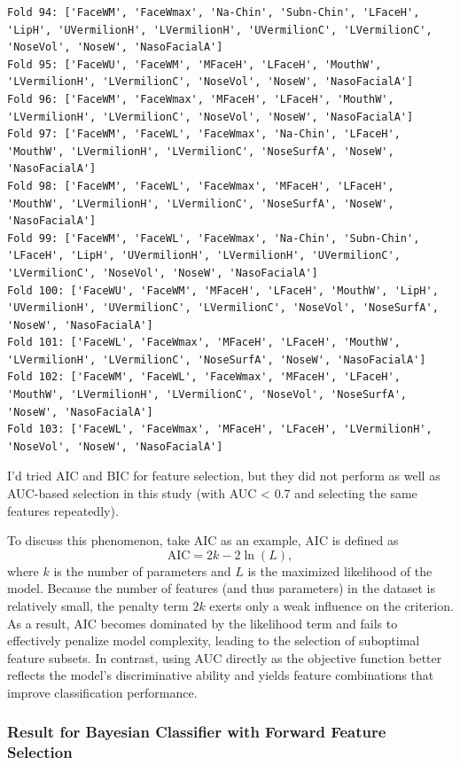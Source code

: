 \documentclass[12pt,a4paper]{article}
\begin{document}
\begin{verbatim}
Fold 94: ['FaceWM', 'FaceWmax', 'Na-Chin', 'Subn-Chin', 'LFaceH', 'LipH', 'UVermilionH', 'LVermilionH', 'UVermilionC', 'LVermilionC', 'NoseVol', 'NoseW', 'NasoFacialA']
Fold 95: ['FaceWU', 'FaceWM', 'MFaceH', 'LFaceH', 'MouthW', 'LVermilionH', 'LVermilionC', 'NoseVol', 'NoseW', 'NasoFacialA']
Fold 96: ['FaceWM', 'FaceWmax', 'MFaceH', 'LFaceH', 'MouthW', 'LVermilionH', 'LVermilionC', 'NoseVol', 'NoseW', 'NasoFacialA']
Fold 97: ['FaceWM', 'FaceWL', 'FaceWmax', 'Na-Chin', 'LFaceH', 'MouthW', 'LVermilionH', 'LVermilionC', 'NoseSurfA', 'NoseW', 'NasoFacialA']
Fold 98: ['FaceWM', 'FaceWL', 'FaceWmax', 'MFaceH', 'LFaceH', 'MouthW', 'LVermilionH', 'LVermilionC', 'NoseSurfA', 'NoseW', 'NasoFacialA']
Fold 99: ['FaceWM', 'FaceWL', 'FaceWmax', 'Na-Chin', 'Subn-Chin', 'LFaceH', 'LipH', 'UVermilionH', 'LVermilionH', 'UVermilionC', 'LVermilionC', 'NoseVol', 'NoseW', 'NasoFacialA']
Fold 100: ['FaceWU', 'FaceWM', 'MFaceH', 'LFaceH', 'MouthW', 'LipH', 'UVermilionH', 'UVermilionC', 'LVermilionC', 'NoseVol', 'NoseSurfA', 'NoseW', 'NasoFacialA']
Fold 101: ['FaceWL', 'FaceWmax', 'MFaceH', 'LFaceH', 'MouthW', 'LVermilionH', 'LVermilionC', 'NoseSurfA', 'NoseW', 'NasoFacialA']
Fold 102: ['FaceWM', 'FaceWL', 'FaceWmax', 'MFaceH', 'LFaceH', 'MouthW', 'LVermilionH', 'LVermilionC', 'NoseVol', 'NoseSurfA', 'NoseW', 'NasoFacialA']
Fold 103: ['FaceWL', 'FaceWmax', 'MFaceH', 'LFaceH', 'LVermilionH', 'NoseVol', 'NoseW', 'NasoFacialA']
\end{verbatim}

I'd tried AIC and BIC for feature selection, but they did not perform as well as AUC-based selection in this study (with AUC < 0.7 and selecting the same features repeatedly). 

To discuss this phenomenon, take AIC as an example, AIC is defined as
$$
\text{AIC} = 2k - 2\ln(L),
$$
where $k$ is the number of parameters and $L$ is the maximized likelihood of the model.  Because the number of features (and thus parameters) in the dataset is relatively small, the penalty term $2k$ exerts only a weak influence on the criterion. 
As a result, AIC becomes dominated by the likelihood term and fails to effectively penalize model complexity, leading to the selection of suboptimal feature subsets. 
In contrast, using AUC directly as the objective function better reflects the model's discriminative ability and yields feature combinations that improve classification performance.

\subsubsection{Result for Bayesian Classifier with Forward Feature Selection}
\end{document}
